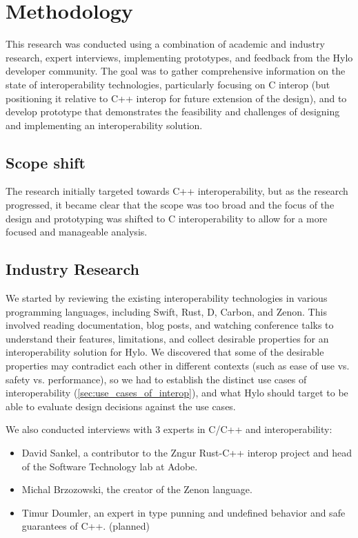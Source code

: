 \section{Methodology}
This research was conducted using a combination of academic and industry research, expert interviews, implementing prototypes, and feedback from the Hylo developer community. The goal was to gather comprehensive information on the state of interoperability technologies, particularly focusing on C interop (but positioning it relative to C++ interop for future extension of the design), and to develop prototype that demonstrates the feasibility and challenges of designing and implementing an interoperability solution.

\subsection{Scope shift}
The research initially targeted towards C++ interoperability, but as the research progressed, it became clear that the scope was too broad and the focus of the design and prototyping was shifted to C interoperability to allow for a more focused and manageable analysis.

\subsection{Industry Research}
We started by reviewing the existing interoperability technologies in various programming languages, including Swift, Rust, D, Carbon, and Zenon. This involved reading documentation, blog posts, and watching conference talks to understand their features, limitations, and collect desirable properties for an interoperability solution for Hylo. We discovered that some of the desirable properties may contradict each other in different contexts (such as ease of use vs. safety vs. performance), so we had to establish the distinct use cases of interoperability (\autoref{sec:use_cases_of_interop}), and what Hylo should  target to be able to evaluate design decisions against the use cases.

We also conducted interviews with 3 experts in C/C++ and interoperability:
\begin{itemize}
    \item David Sankel, a contributor to the Zngur Rust-C++ interop project and head of the Software Technology lab at Adobe.
    \item Michal Brzozowski, the creator of the Zenon language.
    \item Timur Doumler, an expert in type punning and undefined behavior and safe guarantees of C++. (planned)
\end{itemize}

